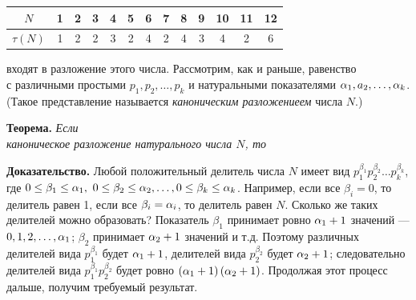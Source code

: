 \begin{multicols}{3}
		\begin{adjustbox}{width=0.66\textwidth}
			\begin{tabular}{|c|c|c|c|c|c|c|c|c|c|c|c|c|}
				\hline
				{\footnotesize $N$} & {\footnotesize 1} & {\footnotesize 2} & {\footnotesize 3} & {\footnotesize 4} & {\footnotesize 5} & {\footnotesize 6} & {\footnotesize 7} & {\footnotesize 8} & {\footnotesize 9} & {\footnotesize 10} & {\footnotesize 11} & {\footnotesize 12}\\
				\hline
				{\footnotesize $\tau \left( N \right)$} & {\footnotesize 1} & {\footnotesize 2} & {\footnotesize 2} & {\footnotesize 3} & {\footnotesize 2} & {\footnotesize 4} & {\footnotesize 2} & {\footnotesize 4} & {\footnotesize 3} & {\footnotesize 4} & {\footnotesize 2} & {\footnotesize 6}\\
				\hline
			\end{tabular}
		\end{adjustbox}
				
		\columnbreak
		\rule{0pt}{3.57 em}
		
		\noindent
		входят в разложение этого числа. Рассмотрим, как и раньше, равенство\\
		с различными простыми $p_1, p_2, \ldots, p_k$ и натуральными показателями  $\alpha_1, a_2, \ldots, \alpha_k$. (Такое представление называется \textit{каноническим разложениеем} числа $N$.)
		
		\textbf{Теорема. }\textit{Если}\\
		\textit{каноническое разложение натурального числа $N$, то}
		\medskip
		
		\medskip
		
		\textbf{Доказательство.} Любой положительный делитель числа $N$ имеет вид $p_1^{\beta_1} p_2^{\beta_2} \ldots p_k^{\beta_k}$, где $0\leq\beta_1\leq\alpha_1,$ $0\leq\beta_ 2\leq\alpha_2,\ldots, 0\leq\beta_k\leq\alpha_k$. Например, если все $\beta_i = 0$, то делитель равен 1, если все $\beta_i = \alpha_i$, то делитель равен $N$. Сколько же таких делителей можно образовать? Показатель $\beta_1$ принимает ровно $\alpha_1 + 1$ значений --- $0, 1, 2, \ldots, \alpha_1$; $\beta_2$ принимает $\alpha_2 + 1$ значений и т.д. Поэтому различных делителей вида $p_1^{\beta_1}$ будет $\alpha_1 + 1$, делителей вида $p_2^{\beta_2}$ будет $\alpha_2 + 1$; следовательно делителей вида $p_1^{\beta_1}p_2^{\beta_2}$ будет ровно $\left(\alpha_1 + 1\right) \left(\alpha_2 + 1\right)$. Продолжая этот процесс дальше, получим требуемый результат.\\
		

\end{multicols}
